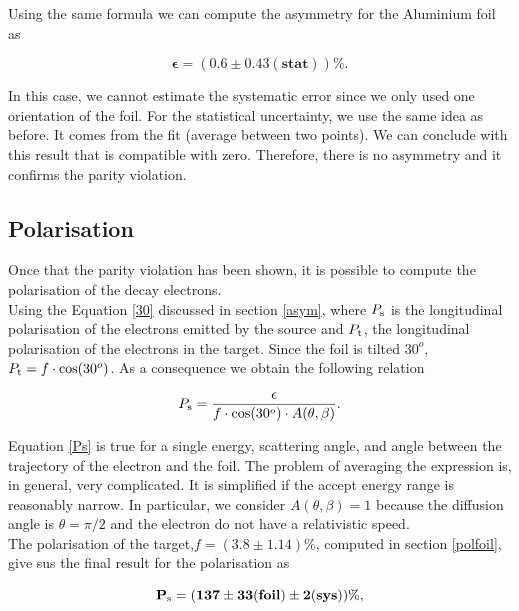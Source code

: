 \documentclass[10pt,swedish, openany]{book}
\begin{document}
Using the same formula we can compute the asymmetry for the Aluminium foil as

\begin{equation*}
    \mathbf{\epsilon = (0.6 \pm 0.43 (stat))\%}.
\end{equation*}

In this case, we cannot estimate the systematic error since we only used one orientation of the foil. For the statistical uncertainty, we use the same idea as before. It comes from the fit (average between two points). We can conclude with this result that is compatible with zero. Therefore, there is no asymmetry and it confirms the parity violation.

\subsection{Polarisation} 

Once that the parity violation has been shown, it is possible to compute the polarisation of the decay electrons.\\

Using the Equation \ref{30} discussed in section \ref{asym}, where $P_{\rm s}$ is the longitudinal polarisation of the electrons emitted by the source and $P_{\rm t}$, the longitudinal polarisation of the electrons in the target. Since the foil is tilted $30^o$, $P_{\rm t} = f\cdot \cos(30^o)$. As a consequence we obtain the following relation

\begin{equation}\label{Ps}
    P_{\rm s} = \frac{\epsilon}{f \cdot \cos(30^o) \cdot A(\theta, \beta)}.
\end{equation}

Equation \ref{Ps} is true for a single energy, scattering angle, and angle between the trajectory of the electron and the foil. The problem of averaging the expression is, in general, very complicated. It is simplified if the accept energy range is reasonably narrow. In particular, we consider $A(\theta, \beta)=1$ because the diffusion angle is $\theta = \pi/2$ and the electron do not have a relativistic speed.\\

The polarisation of the target,$f=(3.8 \pm 1.14)\%$, computed in section \ref{polfoil}, give sus the final result for the polarisation as

\begin{equation*}
    \mathbf{ P_{\rm s} = (137 \pm 33 (foil) \pm 2 (sys))\%},
\end{equation*}
\end{document}
